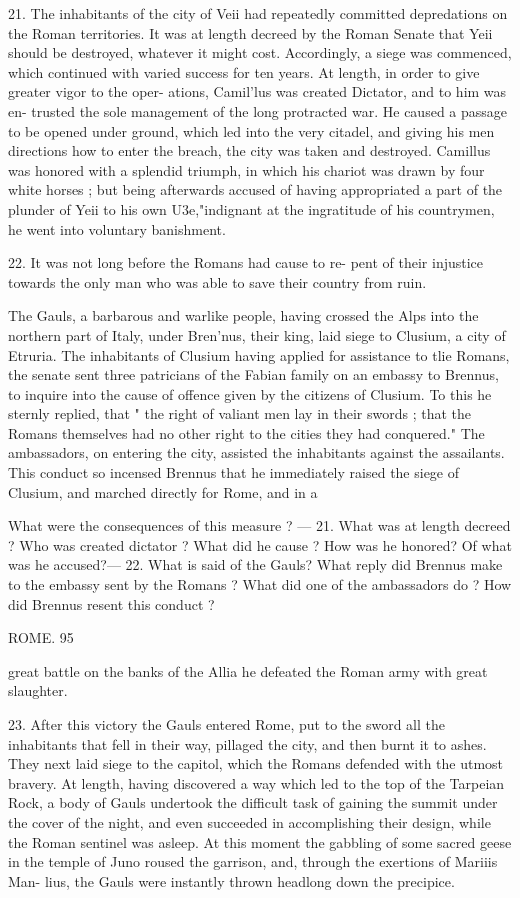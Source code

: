 \documentclass[openany,a4paper]{memoir}
\begin{document}
21. The inhabitants of the city of Veii had repeatedly 
committed depredations on the Roman territories. It was 
at length decreed by the Roman Senate that Yeii should be 
destroyed, whatever it might cost. Accordingly, a siege was 
commenced, which continued with varied success for ten 
years. At length, in order to give greater vigor to the oper- 
ations, Camil'lus was created Dictator, and to him was en- 
trusted the sole management of the long protracted war. He 
caused a passage to be opened under ground, which led into 
the very citadel, and giving his men directions how to enter 
the breach, the city was taken and destroyed. Camillus was 
honored with a splendid triumph, in which his chariot was 
drawn by four white horses ; but being afterwards accused 
of having appropriated a part of the plunder of Yeii to his 
own U3e,"indignant at the ingratitude of his countrymen, he 
went into voluntary banishment. 

22. It was not long before the Romans had cause to re- 
pent of their injustice towards the only man who was able 
to save their country from ruin. 

The Gauls, a barbarous and warlike people, having crossed 
the Alps into the northern part of Italy, under Bren'nus, 
their king, laid siege to Clusium, a city of Etruria. The 
inhabitants of Clusium having applied for assistance to tlie 
Romans, the senate sent three patricians of the Fabian family 
on an embassy to Brennus, to inquire into the cause of 
offence given by the citizens of Clusium. To this he sternly 
replied, that " the right of valiant men lay in their swords ; 
that the Romans themselves had no other right to the cities 
they had conquered." The ambassadors, on entering the 
city, assisted the inhabitants against the assailants. This 
conduct so incensed Brennus that he immediately raised the 
siege of Clusium, and marched directly for Rome, and in a 

What were the consequences of this measure ? — 21. What was at length 
decreed ? Who was created dictator ? What did he cause ? How was he 
honored? Of what was he accused?— 22. What is said of the Gauls? 
What reply did Brennus make to the embassy sent by the Romans ? 
What did one of the ambassadors do ? How did Brennus resent this 
conduct ? 



ROME. 95 

great battle on the banks of the Allia he defeated the Roman 
army with great slaughter. 

23. After this victory the Gauls entered Rome, put to the 
sword all the inhabitants that fell in their way, pillaged the 
city, and then burnt it to ashes. They next laid siege to 
the capitol, which the Romans defended with the utmost 
bravery. At length, having discovered a way which led to 
the top of the Tarpeian Rock, a body of Gauls undertook 
the difficult task of gaining the summit under the cover of 
the night, and even succeeded in accomplishing their design, 
while the Roman sentinel was asleep. At this moment the 
gabbling of some sacred geese in the temple of Juno roused 
the garrison, and, through the exertions of Mariiis Man- 
lius, the Gauls were instantly thrown headlong down the 
precipice. 
\end{document}
